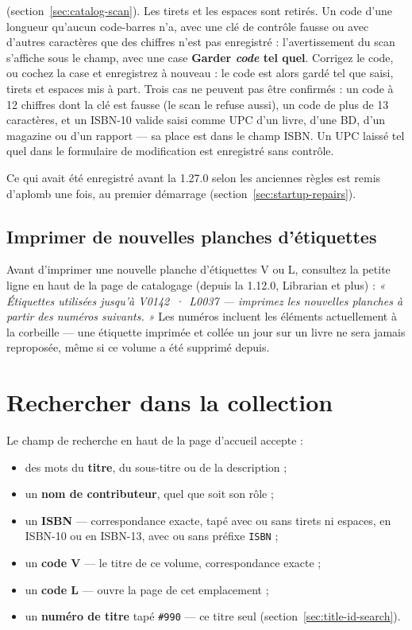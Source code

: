 \begin{itemize}
        (section~\ref{sec:catalog-scan}). Les tirets et les espaces sont
        retirés. Un code d'une longueur qu'aucun code-barres n'a, avec
        une clé de contrôle fausse ou avec d'autres caractères que des
        chiffres n'est pas enregistré : l'avertissement du scan
        s'affiche sous le champ, avec une case \textbf{Garder
        \emph{code} tel quel}. Corrigez le code, ou cochez la case et
        enregistrez à nouveau : le code est alors gardé tel que saisi,
        tirets et espaces mis à part. Trois cas ne peuvent pas être confirmés : un code à
        12 chiffres dont la clé est fausse (le scan le refuse aussi), un
        code de plus de 13 caractères, et un ISBN-10 valide saisi comme
        UPC d'un livre, d'une BD, d'un magazine ou d'un rapport --- sa
        place est dans le champ ISBN. Un UPC laissé tel quel dans le
        formulaire de modification est enregistré sans contrôle.
\end{itemize}

Ce qui avait été enregistré avant la 1.27.0 selon les anciennes règles
est remis d'aplomb une fois, au premier démarrage
(section~\ref{sec:startup-repairs}).

\subsection*{Imprimer de nouvelles planches d'étiquettes}

Avant d'imprimer une nouvelle planche d'étiquettes V ou L, consultez
la petite ligne en haut de la page de catalogage (depuis la 1.12.0,
Librarian et plus) : \emph{« Étiquettes utilisées jusqu'à
V0142~·~L0037 — imprimez les nouvelles planches à partir des numéros
suivants. »} Les numéros incluent les éléments actuellement à la
corbeille — une étiquette imprimée et collée un jour sur un livre ne
sera jamais reproposée, même si ce volume a été supprimé depuis.

\section{Rechercher dans la collection}\label{sec:search}

Le champ de recherche en haut de la page d'accueil accepte :

\begin{itemize}
  \item des mots du \textbf{titre}, du sous-titre ou de la description ;
  \item un \textbf{nom de contributeur}, quel que soit son rôle ;
  \item un \textbf{ISBN} --- correspondance exacte, tapé avec ou sans
        tirets ni espaces, en ISBN-10 ou en ISBN-13, avec ou sans
        préfixe \texttt{ISBN} ;
  \item un \textbf{code V} --- le titre de ce volume, correspondance
        exacte ;
  \item un \textbf{code L} --- ouvre la page de cet emplacement ;
  \item un \textbf{numéro de titre} tapé \texttt{\#990} --- ce titre seul
        (section~\ref{sec:title-id-search}).
\end{itemize}

